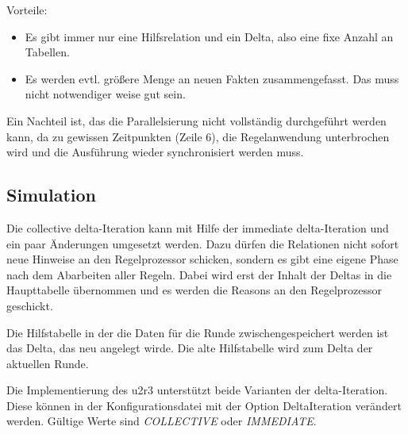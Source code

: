 Vorteile:
\begin{itemize}
  \item Es gibt immer nur eine Hilfsrelation und ein Delta, also eine fixe Anzahl an Tabellen.
  \item Es werden evtl. größere Menge an neuen Fakten zusammengefasst. Das muss nicht notwendiger weise gut sein.
\end{itemize}

Ein Nachteil ist, das die Parallelsierung nicht vollständig durchgeführt werden kann, da zu gewissen Zeitpunkten (Zeile 6), die Regelanwendung unterbrochen wird und die Ausführung wieder synchronisiert werden muss.

\subsection{Simulation}

Die collective delta-Iteration kann mit Hilfe der immediate delta-Iteration und ein paar Änderungen umgesetzt werden. Dazu dürfen die Relationen nicht sofort neue Hinweise an den Regelprozessor schicken, sondern es gibt eine eigene Phase nach dem Abarbeiten aller Regeln. Dabei wird erst der Inhalt der Deltas in die Haupttabelle übernommen und es werden die Reasons an den Regelprozessor geschickt.

Die Hilfstabelle in der die Daten für die Runde zwischengespeichert werden ist das Delta, das neu angelegt wirde. Die alte Hilfstabelle wird zum Delta der aktuellen Runde.

Die Implementierung des u2r3 unterstützt beide Varianten der delta-Iteration. Diese können in der Konfigurationsdatei mit der Option DeltaIteration verändert werden. Gültige Werte sind \emph{COLLECTIVE} oder \emph{IMMEDIATE}.
